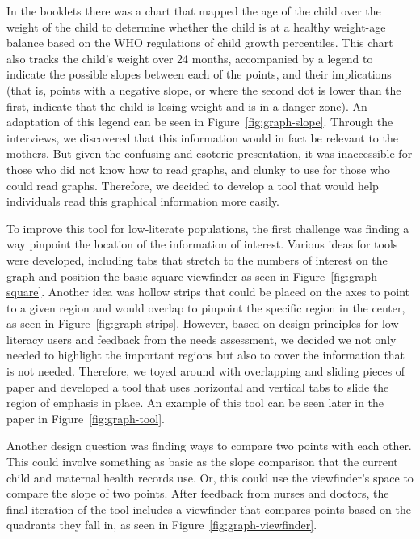 \documentclass{sig-alternate}
\begin{document}
In the booklets there was a chart that mapped the age of the child over the weight of the child to determine whether the child is at a healthy weight-age balance based on the WHO regulations of child growth percentiles. This chart also tracks the child's weight over 24 months, accompanied by a legend to indicate the possible slopes between each of the points, and their implications (that is, points with a negative slope, or where the second dot is lower than the first, indicate that the child is losing weight and is in a danger zone). An adaptation of this legend can be seen in Figure~\ref{fig:graph-slope}. Through the interviews, we discovered that this information would in fact be relevant to the mothers. But given the confusing and esoteric presentation, it was inaccessible for those who did not know how to read graphs, and clunky to use for those who could read graphs. Therefore, we decided to develop a tool that would help individuals read this graphical information more easily.

To improve this tool for low-literate populations, the first challenge was finding a way pinpoint the location of the information of interest. Various ideas for tools were developed, including tabs that stretch to the numbers of interest on the graph and position the basic square viewfinder as seen in Figure~\ref{fig:graph-square}. Another idea was hollow strips that could be placed on the axes to point to a given region and would overlap to pinpoint the specific region in the center, as seen in Figure~\ref{fig:graph-strips}. However, based on design principles for low-literacy users and feedback from the needs assessment, we decided we not only needed to highlight the important regions but also to cover the information that is not needed. Therefore, we toyed around with overlapping and sliding pieces of paper and developed a tool that uses horizontal and vertical tabs to slide the region of emphasis in place. An example of this tool can be seen later in the paper in Figure~\ref{fig:graph-tool}.

Another design question was finding ways to compare two points with each other. This could involve something as basic as the slope comparison that the current child and maternal health records use. Or, this could use the viewfinder's space to compare the slope of two points. After feedback from nurses and doctors, the final iteration of the tool includes a viewfinder that compares points based on the quadrants they fall in, as seen in Figure~\ref{fig:graph-viewfinder}.
\end{document}
